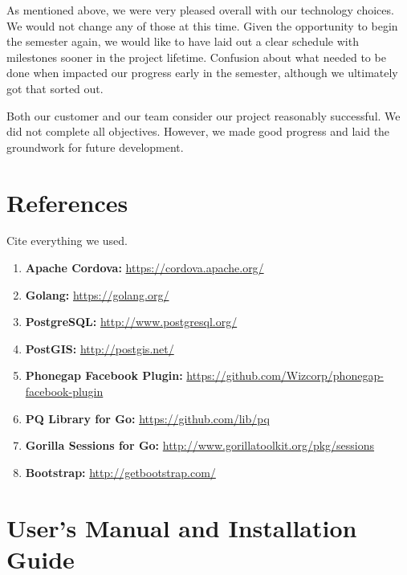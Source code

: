 \documentclass{article}
\begin{document}
As mentioned above, we were very pleased overall with our technology
choices. We would not change any of those at this time. Given the opportunity
to begin the semester again, we would like to have laid out a clear schedule
with milestones sooner in the project lifetime. Confusion about what needed to
be done when impacted our progress early in the semester, although we
ultimately got that sorted out.

Both our customer and our team consider our project reasonably successful. We
did not complete all objectives. However, we made good progress and laid the
groundwork for future development.

\section{References}
Cite everything we used.
\begin{enumerate}

\item \textbf{Apache Cordova:} \url{https://cordova.apache.org/}
\item \textbf{Golang:} \url{https://golang.org/}
\item \textbf{PostgreSQL:} \url{http://www.postgresql.org/}
\item \textbf{PostGIS:} \url{http://postgis.net/}
\item \textbf{Phonegap Facebook Plugin:} \url{https://github.com/Wizcorp/phonegap-facebook-plugin}
\item \textbf{PQ Library for Go:} \url{https://github.com/lib/pq}
\item \textbf{Gorilla Sessions for Go:} \url{http://www.gorillatoolkit.org/pkg/sessions}
\item \textbf{Bootstrap:} \url{http://getbootstrap.com/}

\end{enumerate}

\section{User's Manual and Installation Guide}
\end{document}
